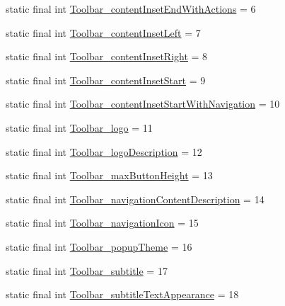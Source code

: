 \begin{DoxyCompactItemize}
\item 
static final int \mbox{\hyperlink{classandroid_1_1support_1_1design_1_1_r_1_1styleable_ad675ba82ebfaa483e6d0eba17711deb9}{Toolbar\+\_\+content\+Inset\+End\+With\+Actions}} = 6
\item 
static final int \mbox{\hyperlink{classandroid_1_1support_1_1design_1_1_r_1_1styleable_a0742be136466ef1d6a26776e0be4c829}{Toolbar\+\_\+content\+Inset\+Left}} = 7
\item 
static final int \mbox{\hyperlink{classandroid_1_1support_1_1design_1_1_r_1_1styleable_ad73822dda4f37103fc7bf98a9bc738e3}{Toolbar\+\_\+content\+Inset\+Right}} = 8
\item 
static final int \mbox{\hyperlink{classandroid_1_1support_1_1design_1_1_r_1_1styleable_a68d6350d263a0ef9072b1b981d832ef7}{Toolbar\+\_\+content\+Inset\+Start}} = 9
\item 
static final int \mbox{\hyperlink{classandroid_1_1support_1_1design_1_1_r_1_1styleable_ae15be1a44663b68b2ff8f2c1e0352e9d}{Toolbar\+\_\+content\+Inset\+Start\+With\+Navigation}} = 10
\item 
static final int \mbox{\hyperlink{classandroid_1_1support_1_1design_1_1_r_1_1styleable_ab0a9b926dbb509c5df3bea32aaa96cd8}{Toolbar\+\_\+logo}} = 11
\item 
static final int \mbox{\hyperlink{classandroid_1_1support_1_1design_1_1_r_1_1styleable_a9e268b93eb8ebe84bb34a177df14a6bb}{Toolbar\+\_\+logo\+Description}} = 12
\item 
static final int \mbox{\hyperlink{classandroid_1_1support_1_1design_1_1_r_1_1styleable_a573da6093a404400731d342841b50168}{Toolbar\+\_\+max\+Button\+Height}} = 13
\item 
static final int \mbox{\hyperlink{classandroid_1_1support_1_1design_1_1_r_1_1styleable_ac7031f062e44f6d4cea72520507e1703}{Toolbar\+\_\+navigation\+Content\+Description}} = 14
\item 
static final int \mbox{\hyperlink{classandroid_1_1support_1_1design_1_1_r_1_1styleable_accd16d6faeffbd100a41b9e447a49189}{Toolbar\+\_\+navigation\+Icon}} = 15
\item 
static final int \mbox{\hyperlink{classandroid_1_1support_1_1design_1_1_r_1_1styleable_a85ad1e9a88b243c3cb9ac4a4eff2e59d}{Toolbar\+\_\+popup\+Theme}} = 16
\item 
static final int \mbox{\hyperlink{classandroid_1_1support_1_1design_1_1_r_1_1styleable_a0364d79d02071a50c5e5716dab29c5ab}{Toolbar\+\_\+subtitle}} = 17
\item 
static final int \mbox{\hyperlink{classandroid_1_1support_1_1design_1_1_r_1_1styleable_a5f9e967ec77cd237d74b93e364172559}{Toolbar\+\_\+subtitle\+Text\+Appearance}} = 18

\end{DoxyCompactItemize}
